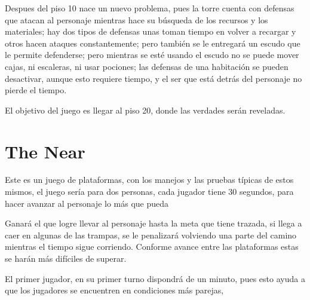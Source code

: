 \documentclass{article}
\begin{document}
Despues del piso 10 nace un nuevo problema, pues la torre cuenta con defensas que atacan al personaje mientras hace su búsqueda de los  recursos y los materiales; hay dos tipos de defensas unas toman tiempo en volver a recargar y otros hacen ataques constantemente; pero también se le entregará un escudo que le permite defenderse; pero mientras se esté usando el escudo no se puede mover cajas, ni escaleras, ni usar pociones; las defensas de una habitación se pueden desactivar, aunque esto requiere tiempo, y el ser que está detrás del personaje no pierde el tiempo.

El objetivo del juego es llegar al piso 20, donde las verdades serán reveladas.

\section{The Near}\label{intro}
Este es un juego de plataformas, con los manejos y las pruebas típicas de estos mismos, el juego sería para dos personas, cada jugador tiene 30 segundos, para hacer avanzar al personaje lo más que pueda 

Ganará el que logre llevar al personaje hasta la meta que tiene trazada, si llega a caer en algunas de las trampas, se le penalizará volviendo una parte del camino mientras el tiempo sigue corriendo. Conforme avance entre las plataformas estas se harán más difíciles de superar.

El primer jugador, en su primer turno dispondrá de un minuto, pues esto ayuda a que los jugadores se encuentren en condiciones más parejas,
\end{document}
